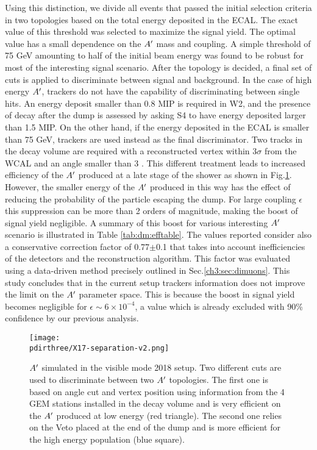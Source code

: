Using this distinction, we divide all events that passed the initial selection criteria in two topologies based on the total energy deposited in the ECAL. The exact value of this threshold was selected to maximize the signal yield. The optimal value has a small dependence on the $\DM$ mass and coupling. A simple threshold of 75 GeV amounting to half of the initial beam energy was found to be robust for most of the interesting signal scenario. After the topology is decided, a final set of cuts is applied to discriminate between signal and background. In the case of high energy $\DM$, trackers do not have the capability of discriminating between single hits. An energy deposit smaller than 0.8 MIP is required in W2, and the presence of decay after the dump is assessed by asking S4 to have energy deposited larger than 1.5 MIP. On the other hand, if the energy deposited in the ECAL is smaller than 75 GeV, trackers are used instead as the final discriminator. Two tracks in the decay volume are required with a reconstructed vertex within 3$\sigma$ from the WCAL and an angle smaller than 3 \mrad. This different treatment leads to increased efficiency of the $\DM$ produced at a late stage of the shower as shown in Fig.\ref{fig:combined-analysis}. However, the smaller energy of the $\DM$ produced in this way has the effect of reducing the probability of the particle escaping the dump. For large coupling $\epsilon$ this suppression can be more than 2 orders of magnitude, making the boost of signal yield negligible. A summary of this boost for various interesting $\DM$ scenario is illustrated in Table \ref{tab:dm:efftable}. The values reported consider also a conservative correction factor of 0.77$\pm$0.1 that takes into account inefficiencies of the detectors and the reconstruction algorithm. This factor was evaluated using a data-driven method precisely outlined in Sec.\ref{ch3:sec:dimuons}. This study concludes that in the current setup trackers information does not improve the limit on the $\DM$ parameter space. This is because the boost in signal yield becomes negligible for $\epsilon \sim 6 \times 10^{-4}$, a value which is already excluded with 90\% confidence by our previous analysis.

\begin{figure}[tbh!]
  \centering
  \texttt{[image: \\pdirthree/X17-separation-v2.png]}
  \caption[Comparison of selected $\DM$ between the calorimeter and tracking analysis]{$\DM$ simulated in the visible mode 2018 setup. Two different cuts are used to discriminate between two $\DM$ topologies. The first one is based on angle cut and vertex position using information from the 4 GEM stations installed in the decay volume and is very efficient on the $\DM$ produced at low energy (red triangle). The second one relies on the Veto placed at the end of the dump and is more efficient for the high energy population (blue square).}
  \label{fig:combined-analysis}
\end{figure}

